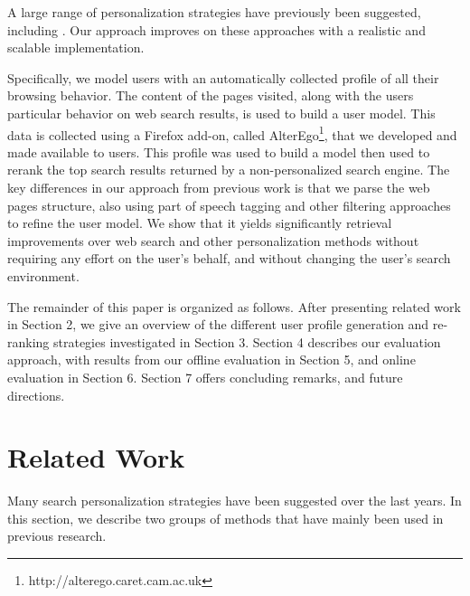 \documentclass{sig-alternate}
\begin{document}
A large range of personalization strategies have previously been suggested, including \cite{Teevan:Main, Qiu:Cho, Chirita:Firan, Chirita:Nejdl, Liu:Yu, Pretschner:Gauch, Speretta:Gauch, Sugiyama:Hatano, Tanudjaja:Mui, Daoud:Tamine, Sun:Zeng, Shen:Tan, Morita:Shinoda, Claypool:Le, Liu:Yubis, Gauch:Chaffee, Sieg:Mobasher, Joachims:Opt, Dou:Song}. Our approach improves on these approaches with a realistic and scalable implementation.

Specifically, we model users with an automatically collected profile of all their browsing behavior. The content of the pages visited, along with the users particular behavior on web search results, is used to build a user model. This data is collected using a Firefox add-on, called AlterEgo\footnote{http://alterego.caret.cam.ac.uk}, that we developed and made available to users. This profile was used to build a model then used to rerank the top search results returned by a non-personalized search engine. The key differences in our approach from previous work is that we parse the web pages structure, also using part of speech tagging and other filtering approaches to refine the user model. We show that it yields significantly retrieval improvements over web search and other personalization methods without requiring any effort on the user's behalf, and without changing the user's search environment.

The remainder of this paper is organized as follows. After presenting related work in Section 2, we give an overview of the different user profile generation and re-ranking strategies investigated in Section 3. Section 4 describes our evaluation approach, with results from our offline evaluation in Section 5, and online evaluation in Section 6. Section 7 offers concluding remarks, and future directions.

\section{Related Work}

Many search personalization strategies have been suggested over the last years. In this section, we describe two groups of methods that have mainly been used in previous research.

\end{document}
